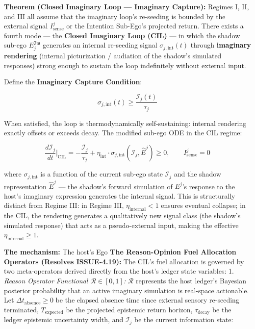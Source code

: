 \documentclass[11pt,a4paper]{article}
\theoremstyle{definition}
\theoremstyle{remark}
\begin{document}
\textbf{Theorem (Closed Imaginary Loop — Imaginary Capture):} Regimes I, II, and III all assume that the imaginary loop's re-seeding is bounded by the external signal $I_{\text{sense}}^j$ or the Intention Sub-Ego's projected return. There exists a fourth mode — the \textbf{Closed Imaginary Loop (CIL)} — in which the shadow sub-ego $E_j^{\mathfrak{Im}}$ generates an internal re-seeding signal $\sigma_{j,\text{int}}(t)$ through \textbf{imaginary rendering} (internal picturization / audiation of the shadow's simulated responses) strong enough to sustain the loop indefinitely without external input.

Define the \textbf{Imaginary Capture Condition}:


\begin{equation}
\boxed{\sigma_{j,\text{int}}(t) \geq \frac{\mathcal{I}_j(t)}{\tau_j}}
\end{equation}


When satisfied, the loop is thermodynamically self-sustaining: internal rendering exactly offsets or exceeds decay. The modified sub-ego ODE in the CIL regime:


\begin{equation}
\frac{d\mathcal{I}_j}{dt}\Bigg|_{\text{CIL}} = -\frac{\mathcal{I}_j}{\tau_j} + \eta_{\text{int}} \cdot \sigma_{j,\text{int}}(\mathcal{I}_j, \hat{E}^j) \geq 0, \qquad I_{\text{sense}}^j = 0
\end{equation}


where $\sigma_{j,\text{int}}$ is a function of the current sub-ego state $\mathcal{I}_j$ and the shadow representation $\hat{E}^j$ — the shadow's forward simulation of $E^j$'s response to the host's imaginary expression generates the internal signal. This is structurally distinct from Regime III: in Regime III, $\eta_{\text{internal}} < 1$ ensures eventual collapse; in the CIL, the rendering generates a qualitatively new signal class (the shadow's simulated response) that acts as a pseudo-external input, making the effective $\eta_{\text{internal}} \geq 1$.

\textbf{The mechanism:} The host's Ego \textbf{The Reason-Opinion Fuel Allocation Operators (Resolves ISSUE-4.19):} The CIL's fuel allocation is governed by two meta-operators derived directly from the host's ledger state variables:
1. \textit{Reason Operator Functional $\mathcal{R} \in [0,1]$:} $\mathcal{R}$ represents the host ledger's Bayesian posterior probability that an active imaginary simulation is real-space actionable. Let $\Delta t_{\text{absence}} \ge 0$ be the elapsed absence time since external sensory re-seeding terminated, $T_{\text{expected}}$ be the projected epistemic return horizon, $\tau_{\text{decay}}$ be the ledger epistemic uncertainty width, and $\mathcal{I}_j$ be the current information state:
\end{document}
